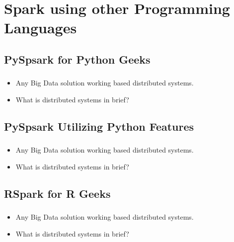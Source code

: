 
\section{Spark using other Programming Languages}

\subsection{PySpsark for Python Geeks}

\begin{frame}
  \frametitle{\subsecname}
	\begin{itemize}[<+->]
		\item Any Big Data solution working based distributed systems.
		\item What is distributed systems in brief?
	\end{itemize}
\end{frame}

\subsection{PySpsark Utilizing Python Features}

\begin{frame}
  \frametitle{\subsecname}
	\begin{itemize}[<+->]
		\item Any Big Data solution working based distributed systems.
		\item What is distributed systems in brief?
	\end{itemize}
\end{frame}

\subsection{RSpark for R Geeks}

\begin{frame}
  \frametitle{\subsecname}
	\begin{itemize}[<+->]
		\item Any Big Data solution working based distributed systems.
		\item What is distributed systems in brief?
	\end{itemize}
\end{frame}

